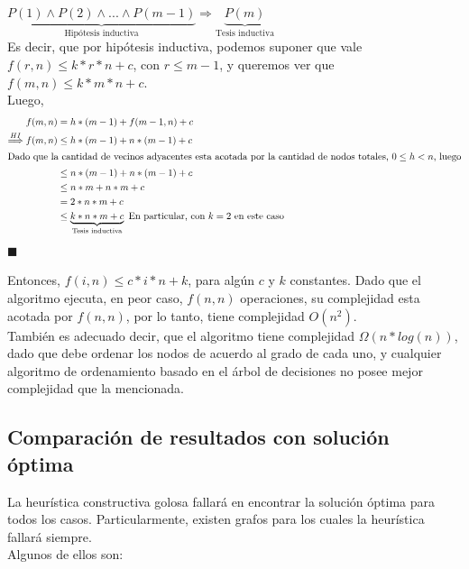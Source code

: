 $\underbrace{P(1) \wedge P(2) \wedge ... \wedge P(m-1)}_{\text{Hipótesis inductiva}} \Rightarrow \underbrace{P(m)}_{\text{Tesis inductiva}}$\\

Es decir, que por hipótesis inductiva, podemos suponer que vale $f(r,n) \leq k*r*n + c$, con $r \leq m-1$, y queremos ver que $f(m,n) \leq k*m*n + c$.\\
Luego,
\begin{align*}
f(m,n) & = h*(m-1) + f(m-1,n) + c \\
 \stackrel{HI}{\Longrightarrow} f(m,n) & \leq h*(m-1) + n*(m-1) + c \\
 \intertext{Dado que la cantidad de vecinos adyacentes esta acotada por la cantidad de nodos totales, $0 \leq h < n$, luego}
 & \leq n*(m-1)+n*(m-1) + c\\
 & \leq n*m + n*m + c\\
 & = 2*n*m + c\\
 & \leq \underbrace{k*n*m + c}_{\text{Tesis inductiva}} \text{       En particular, con $k = 2$ en este caso}
\end{align*}
\hfill $\blacksquare$

Entonces, $f(i,n) \leq c*i*n + k$, para algún $c$ y $k$ constantes.
Dado que el algoritmo ejecuta, en peor caso, $f(n,n)$ operaciones, su complejidad esta acotada por $f(n,n)$, por lo tanto, tiene complejidad $O(n^{2})$.\\

También es adecuado decir, que el algoritmo tiene complejidad $\Omega(n*log(n))$, dado que debe ordenar los nodos de acuerdo al grado de cada uno, y cualquier algoritmo de ordenamiento basado en el árbol de decisiones no posee mejor complejidad que la mencionada.

\subsection{Comparaci\'on de resultados con soluci\'on \'optima}
La heurística constructiva golosa fallará en encontrar la solución óptima para todos los casos.
Particularmente, existen grafos para los cuales la heurística fallará siempre.\\
Algunos de ellos son:


